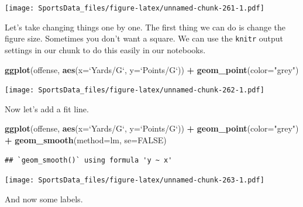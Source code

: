 \documentclass[]{book}
\newenvironment{Shaded}{\begin{snugshade}}{\end{snugshade}}
\newcommand{\DataTypeTok}[1]{\textcolor[rgb]{0.13,0.29,0.53}{#1}}
\newcommand{\KeywordTok}[1]{\textcolor[rgb]{0.13,0.29,0.53}{\textbf{#1}}}
\newcommand{\NormalTok}[1]{#1}
\newcommand{\OperatorTok}[1]{\textcolor[rgb]{0.81,0.36,0.00}{\textbf{#1}}}
\newcommand{\OtherTok}[1]{\textcolor[rgb]{0.56,0.35,0.01}{#1}}
\newcommand{\StringTok}[1]{\textcolor[rgb]{0.31,0.60,0.02}{#1}}
\begin{document}
\texttt{[image: SportsData\_files/figure-latex/unnamed-chunk-261-1.pdf]}

Let's take changing things one by one. The first thing we can do is change the figure size. Sometimes you don't want a square. We can use the \texttt{knitr} output settings in our chunk to do this easily in our notebooks.

\begin{Shaded}
\begin{Highlighting}[]
\KeywordTok{ggplot}\NormalTok{(offense, }\KeywordTok{aes}\NormalTok{(}\DataTypeTok{x=}\StringTok{`}\DataTypeTok{Yards/G}\StringTok{`}\NormalTok{, }\DataTypeTok{y=}\StringTok{`}\DataTypeTok{Points/G}\StringTok{`}\NormalTok{)) }\OperatorTok{+}\StringTok{ }
\StringTok{  }\KeywordTok{geom_point}\NormalTok{(}\DataTypeTok{color=}\StringTok{"grey"}\NormalTok{)}
\end{Highlighting}
\end{Shaded}

\texttt{[image: SportsData\_files/figure-latex/unnamed-chunk-262-1.pdf]}

Now let's add a fit line.

\begin{Shaded}
\begin{Highlighting}[]
\KeywordTok{ggplot}\NormalTok{(offense, }\KeywordTok{aes}\NormalTok{(}\DataTypeTok{x=}\StringTok{`}\DataTypeTok{Yards/G}\StringTok{`}\NormalTok{, }\DataTypeTok{y=}\StringTok{`}\DataTypeTok{Points/G}\StringTok{`}\NormalTok{)) }\OperatorTok{+}\StringTok{ }
\StringTok{  }\KeywordTok{geom_point}\NormalTok{(}\DataTypeTok{color=}\StringTok{"grey"}\NormalTok{) }\OperatorTok{+}\StringTok{ }\KeywordTok{geom_smooth}\NormalTok{(}\DataTypeTok{method=}\NormalTok{lm, }\DataTypeTok{se=}\OtherTok{FALSE}\NormalTok{)}
\end{Highlighting}
\end{Shaded}

\begin{verbatim}
## `geom_smooth()` using formula 'y ~ x'
\end{verbatim}

\texttt{[image: SportsData\_files/figure-latex/unnamed-chunk-263-1.pdf]}

And now some labels.
\end{document}
